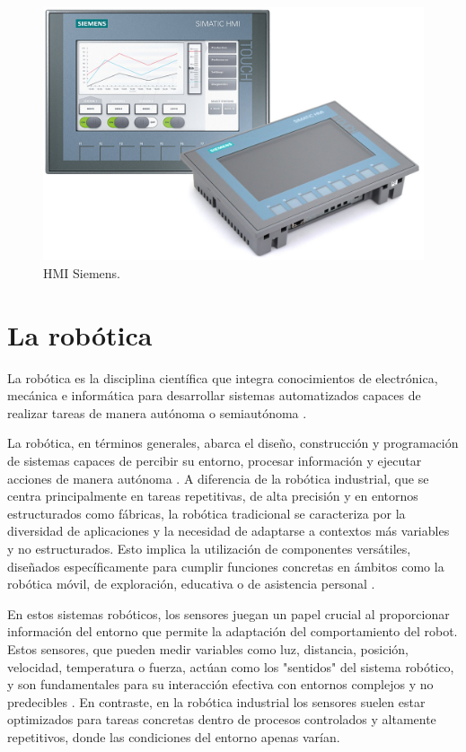 \begin{figure} [h!]
  \begin{center}
    \includegraphics[width=13cm]{figs/HMI}
  \end{center}
  \caption{\centering HMI Siemens.}
  \label{fig:HMI}
\end{figure} 

\section{La robótica}
\label{sec:segundaseccion} %

La robótica es la disciplina científica que integra conocimientos de electrónica, mecánica e informática para desarrollar sistemas automatizados capaces de realizar tareas de manera autónoma o semiautónoma \cite{definicion_robot}. 

La robótica, en términos generales, abarca el diseño, construcción y programación de sistemas capaces de percibir su entorno, procesar información y ejecutar acciones de manera autónoma \cite{definicion_robot_2}. A diferencia de la robótica industrial, que se centra principalmente en tareas repetitivas, de alta precisión y en entornos estructurados como fábricas, la robótica tradicional se caracteriza por la diversidad de aplicaciones y la necesidad de adaptarse a contextos más variables y no estructurados. Esto implica la utilización de componentes versátiles, diseñados específicamente para cumplir funciones concretas en ámbitos como la robótica móvil, de exploración, educativa o de asistencia personal \cite{definicion_robot_2}.

En estos sistemas robóticos, los sensores juegan un papel crucial al proporcionar información del entorno que permite la adaptación del comportamiento del robot. Estos sensores, que pueden medir variables como luz, distancia, posición, velocidad, temperatura o fuerza, actúan como los "sentidos" del sistema robótico, y son fundamentales para su interacción efectiva con entornos complejos y no predecibles \cite{definicion_robot_2}. En contraste, en la robótica industrial los sensores suelen estar optimizados para tareas concretas dentro de procesos controlados y altamente repetitivos, donde las condiciones del entorno apenas varían.

